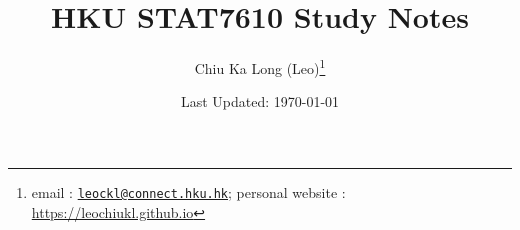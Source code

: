 \documentclass{article}
\begin{document}
\title{HKU STAT7610 Study Notes}
\author{Chiu Ka Long (Leo)\thanks{
email :
\href{mailto:leockl@connect.hku.hk}{\texttt{leockl@connect.hku.hk}};
personal website :
\url{https://leochiukl.github.io}
}}
\date{Last Updated: \today}
\maketitle
\doclicenseThis
\tableofcontents
\nocite{*}


\printbibliography

\end{document}
